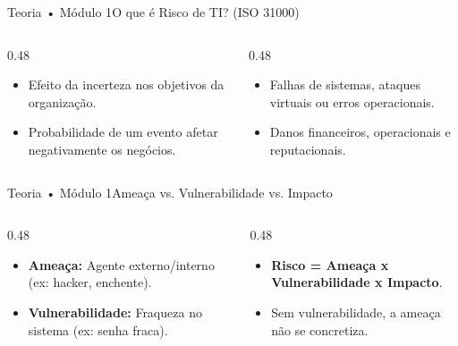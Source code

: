 \begin{senaiframe}{Teoria • Módulo 1}{O que é Risco de TI? (ISO 31000)}
  \begin{columns}[t]
    \begin{column}{0.48\textwidth}
      \begin{tcolorbox}[senaibluecard, title={Definição Geral}]
        \begin{itemize}
          \item Efeito da incerteza nos objetivos da organização.
          \item Probabilidade de um evento afetar negativamente os negócios.
        \end{itemize}
      \end{tcolorbox}
    \end{column}
    \begin{column}{0.48\textwidth}
      \begin{tcolorbox}[senaicard, title={Contexto da TI}]
        \begin{itemize}
          \item Falhas de sistemas, ataques virtuais ou erros operacionais.
          \item Danos financeiros, operacionais e reputacionais.
        \end{itemize}
      \end{tcolorbox}
    \end{column}
  \end{columns}
\end{senaiframe}

\begin{senaiframe}{Teoria • Módulo 1}{Ameaça vs. Vulnerabilidade vs. Impacto}
  \begin{columns}[t]
    \begin{column}{0.48\textwidth}
      \begin{tcolorbox}[senairedcard, title={Ameaça \& Vulnerabilidade}]
        \begin{itemize}
          \item \textbf{Ameaça:} Agente externo/interno (ex: hacker, enchente).
          \item \textbf{Vulnerabilidade:} Fraqueza no sistema (ex: senha fraca).
        \end{itemize}
      \end{tcolorbox}
    \end{column}
    \begin{column}{0.48\textwidth}
      \begin{tcolorbox}[senaiambercard, title={Equação do Risco}]
        \begin{itemize}
          \item \textbf{Risco = Ameaça x Vulnerabilidade x Impacto}.
          \item Sem vulnerabilidade, a ameaça não se concretiza.
        \end{itemize}
      \end{tcolorbox}
    \end{column}
  \end{columns}
\end{senaiframe}

